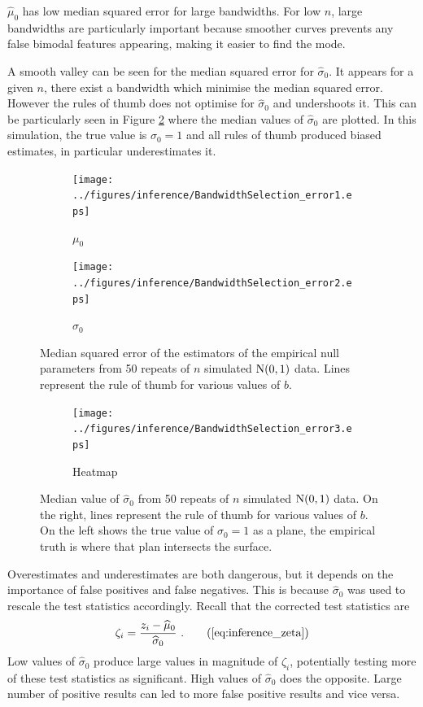 $\widehat{\mu}_0$ has low median squared error for large bandwidths. For low $n$, large bandwidths are particularly important because smoother curves prevents any false bimodal features appearing, making it easier to find the mode.

A smooth valley can be seen for the median squared error for $\widehat{\sigma}_0$. It appears for a given $n$, there exist a bandwidth which minimise the median squared error. However the rules of thumb does not optimise for $\widehat{\sigma}_0$ and undershoots it. This can be particularly seen in Figure \ref{fig:inference_ZNull2} where the median values of $\widehat{\sigma}_0$ are plotted. In this simulation, the true value is $\sigma_0=1$ and all rules of thumb produced biased estimates, in particular underestimates it.

\begin{figure}
	\centering
    \begin{subfigure}[b]{0.49\textwidth}
        \texttt{[image: ../figures/inference/BandwidthSelection\_error1.eps]}
        \caption{$\mu_0$}
    \end{subfigure}
    \begin{subfigure}[b]{0.49\textwidth}
        \texttt{[image: ../figures/inference/BandwidthSelection\_error2.eps]}
        \caption{$\sigma_0$}
    \end{subfigure}
    \caption{Median squared error of the estimators of the empirical null parameters from 50 repeats of $n$ simulated $\operatorname{N}(0,1)$ data. Lines represent the rule of thumb for various values of $b$.}
    \label{fig:inference_ZNull1}
\end{figure}

\begin{figure}
	\centering
    \begin{subfigure}[b]{0.49\textwidth}
        \texttt{[image: ../figures/inference/BandwidthSelection\_error3.eps]}
        \caption{Heatmap}
    \end{subfigure}
    \caption{Median value of $\widehat{\sigma}_0$ from 50 repeats of $n$ simulated $\operatorname{N}(0,1)$ data. On the right, lines represent the rule of thumb for various values of $b$. On the left shows the true value of $\sigma_0=1$ as a plane, the empirical truth is where that plan intersects the surface.}
    \label{fig:inference_ZNull2}
\end{figure}

Overestimates and underestimates are both dangerous, but it depends on the importance of false positives and false negatives. This is because $\widehat{\sigma}_0$ was used to rescale the test statistics accordingly. Recall that the corrected test statistics are
\begin{equation}
	\zeta_i = \dfrac{
		z_i - \widehat{\mu}_0
	}
	{
		\widehat{\sigma}_0
	}
	\ .
	\tag{\ref{eq:inference_zeta}}
\end{equation}
Low values of $\widehat{\sigma}_0$ produce large values in magnitude of $\zeta_i$, potentially testing more of these test statistics as significant. High values of $\widehat{\sigma}_0$ does the opposite. Large number of positive results can led to more false positive results and vice versa.

